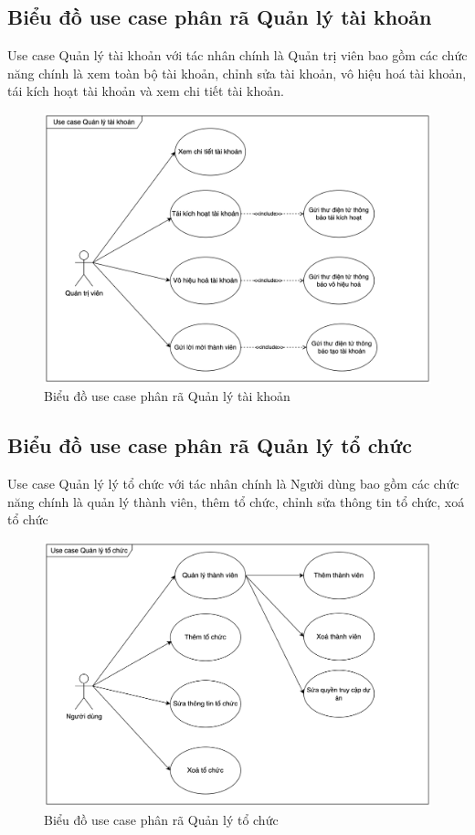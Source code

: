 \documentclass[../DoAn.tex]{subfiles}
\begin{document}
\subsection{Biểu đồ use case phân rã Quản lý tài khoản}
\label{subsection:2.2.2}
Use case Quản lý tài khoản với tác nhân chính là Quản trị viên bao gồm các chức năng chính là xem toàn bộ tài khoản, chỉnh sửa tài khoản, vô hiệu hoá tài khoản,
tái kích hoạt tài khoản và xem chi tiết tài khoản.
\begin{figure}[H]
    \centering
    \includegraphics[width=1.0\linewidth]{Hinhve/AccountUseCases.png}
    \caption{Biểu đồ use case phân rã Quản lý tài khoản}
    \label{fig:AccountUseCases}
\end{figure}
\newpage

\subsection{Biểu đồ use case phân rã Quản lý tổ chức}
\label{subsection:2.2.3}
Use case Quản lý lý tổ chức với tác nhân chính là Người dùng bao gồm các chức năng chính là quản lý thành viên, thêm tổ chức, chỉnh sửa thông tin tổ chức, xoá tổ chức
\begin{figure}[H]
    \centering
    \includegraphics[width=1.0\linewidth]{Hinhve/WorkspaceUseCases.png}
    \caption{Biểu đồ use case phân rã Quản lý tổ chức}
    \label{fig:WorkspaceUseCases}
\end{figure}
\newpage
\end{document}
